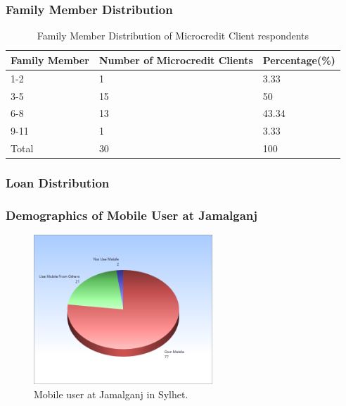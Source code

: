 \documentclass{beamer}
\begin{document}
\begin{frame}
\frametitle{Family Member Distribution}

\begin{table}[!h]
\centering
\begin{tabular}{|l|l|l|}
\hline
\textbf{Family Member} & \textbf{Number of Microcredit Clients} & \textbf{Percentage(\%)}\\
\hline
1-2 & 1 & 3.33\\
3-5 & 15 & 50\\
6-8 & 13 & 43.34\\
9-11 & 1 & 3.33\\
\hline
Total & 30 & 100\\
\hline

\end{tabular}
\caption{Family Member Distribution of Microcredit Client respondents}
\end{table}

\end{frame}

\begin{frame}
\frametitle{Loan Distribution}

\begin{table}[!h]
\centering
{}
\caption{Loan Distribution of Microcredit Client respondents}
\end{table}



\end{frame}

\begin{frame}
\frametitle{Demographics of Mobile User at Jamalganj}
\begin{figure}
\includegraphics[width=0.6\textwidth]{g4.png}
\caption{Mobile user at Jamalganj in Sylhet.}
\end{figure}
\end{frame}
\end{document}
